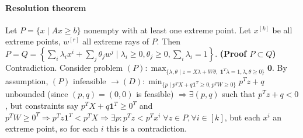 \documentclass{article}
\begin{document}
\paragraph{Resolution theorem}
Let $P = \{x \mid Ax\geq b\}$ nonempty with at least one extreme point. Let $x^{[k]}$ be all extreme points, $w^{[r]}$ all extreme rays of $P$. 
Then $P = Q = \left\{\sum_i \lambda_ix^i + \sum_j\theta_jw^j \mid \lambda_i \geq 0, \theta_j \geq 0, \sum_i\lambda_i = 1\right\}$. 
\textbf{(Proof $P \subset Q$)} Contradiction. Consider problem $(P):\max_{\{\lambda, \theta \mid z = X\lambda + W\theta,\;\mathbf{1}^T\lambda = 1, \lambda,\theta \geq 0\}} \mathbf{0}$. By assumption, $(P)$ infeasible $\rightarrow (D):\min_{\{p\mid p^TX + q\mathbf{1}^T\geq 0,  p^TW \geq 0 \}}p^Tz + q$ unbounded (since $(p,q)=(0,0)$ is feasible) $\Rightarrow \exists (p,q)$ such that $p^Tz + q < 0$, but constraints say $p^TX + q\mathbf{1}^T \geq 0^T$ and $p^TW\geq 0^T \Rightarrow p^Tz\mathbf{1}^T < p^TX \Rightarrow \exists p: p^Tz < p^Tx^i\;\forall z\in P, \forall i\in [k]$, but each $x^i$ an extreme point, so for each $i$ this is a contradiction.
\end{document}
